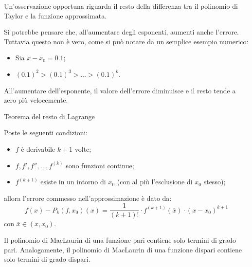\documentclass[12pt]{report}
\begin{document}
	\begin{osservazione}{}{}
		
		Un'osservazione opportuna riguarda il resto della differenza tra il polinomio di Taylor e la funzione approssimata.
		
		Si potrebbe pensare che, all'aumentare degli esponenti, aumenti anche l'errore. Tuttavia questo non è vero, come si può notare da un semplice esempio numerico:
		\begin{itemize}
			
			\item Sia $x - x_0 = 0.1$;
			
			\item $(0.1)^2 > (0.1)^3 > \dots > (0.1)^k$.
			
		\end{itemize}
		All'aumentare dell'esponente, il valore dell'errore diminuisce e il resto tende a zero più velocemente.
		
	\end{osservazione}
	
	\begin{teorema}{Teorema del resto di Lagrange}{}
		
		Poste le seguenti condizioni:
		\begin{itemize}
			
			\item $f$ è derivabile $k+1$ volte;
			
			\item $f, f', f'', \dots, f^{(k)}$ sono funzioni continue;
			
			\item $f^{(k+1)}$ esiste in un intorno di $x_0$ (con al più l'esclusione di $x_0$ stesso);
			
		\end{itemize}
		allora l'errore commesso nell'approssimazione è dato da:
		\[
		f(x) - P_k(f, x_0)(x) = \frac{1}{(k+1)!} \cdot f^{(k+1)}(\overline{x}) \cdot (x - x_0)^{k+1}
		\]
		con $\overline{x} \in (x, x_0)$.
		
	\end{teorema}
	
	\begin{proposizione}{}{}
		
		Il polinomio di MacLaurin di una funzione pari contiene solo termini di grado pari. Analogamente, il polinomio di MacLaurin di una funzione dispari contiene solo termini di grado dispari.
		
	\end{proposizione}
	
\end{document}
